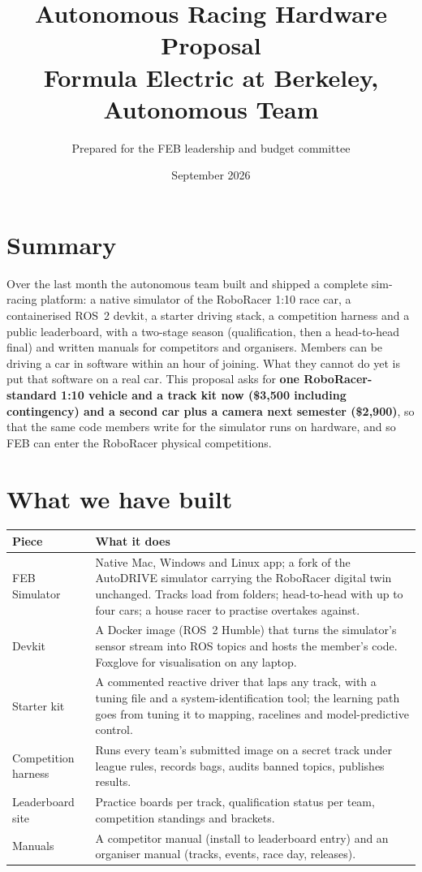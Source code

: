 \documentclass[11pt,a4paper]{article}
\title{\color{febblue}\LARGE Autonomous Racing Hardware Proposal\\[4pt]\large Formula Electric at Berkeley, Autonomous Team}
\author{Prepared for the FEB leadership and budget committee}
\date{September 2026}
\begin{document}
\maketitle

\section*{Summary}

Over the last month the autonomous team built and shipped a complete sim-racing platform:
a native simulator of the RoboRacer 1:10 race car, a containerised ROS~2 devkit, a starter
driving stack, a competition harness and a public leaderboard, with a two-stage season
(qualification, then a head-to-head final) and written manuals for competitors and organisers.
Members can be driving a car in software within an hour of joining. What they cannot do yet is
put that software on a real car. This proposal asks for \textbf{one RoboRacer-standard 1:10
vehicle and a track kit now (\$3{,}500 including contingency) and a second car plus a camera
next semester (\$2{,}900)}, so that
the same code members write for the simulator runs on hardware, and so FEB can enter the
RoboRacer physical competitions.

\section{What we have built}

\begin{tabularx}{\linewidth}{lX}
\toprule
Piece & What it does \\
\midrule
FEB Simulator & Native Mac, Windows and Linux app; a fork of the AutoDRIVE simulator carrying the RoboRacer digital twin unchanged. Tracks load from folders; head-to-head with up to four cars; a house racer to practise overtakes against. \\
Devkit & A Docker image (ROS~2 Humble) that turns the simulator's sensor stream into ROS topics and hosts the member's code. Foxglove for visualisation on any laptop. \\
Starter kit & A commented reactive driver that laps any track, with a tuning file and a system-identification tool; the learning path goes from tuning it to mapping, racelines and model-predictive control. \\
Competition harness & Runs every team's submitted image on a secret track under league rules, records bags, audits banned topics, publishes results. \\
Leaderboard site & Practice boards per track, qualification status per team, competition standings and brackets. \\
Manuals & A competitor manual (install to leaderboard entry) and an organiser manual (tracks, events, race day, releases). \\
\bottomrule
\end{tabularx}
\end{document}
